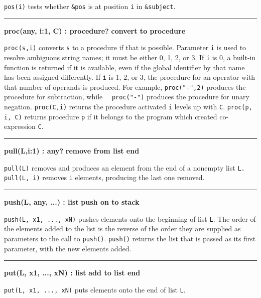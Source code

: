 \noindent
{}\texttt{pos(i)} tests whether \texttt{\&pos} is at
position \texttt{i} in \texttt{\&subject}.

\bigskip\hrule\vspace{0.1cm}
\noindent
{\bf proc(any, i:1, C) : procedure? } \hfill {\bf convert to procedure}

\noindent
{}\texttt{proc(s,i)} converts \texttt{s} to a procedure
if that is possible. Parameter \texttt{i} is used to resolve ambiguous
string names; it must be either 0, 1, 2, or 3. If \texttt{i} is 0, a
built-in function is returned if it is available, even if the global
identifier by that name has been assigned differently. If \texttt{i} is
1, 2, or 3, the procedure for an operator with that number of operands
is produced. For example,
\texttt{proc("-",2)} produces the procedure
for subtraction, while
\ \ \texttt{proc("-")} produces the
procedure for unary negation. \texttt{proc(C,i)} returns the procedure
activated \texttt{i} levels up with \texttt{C}. \texttt{proc(p, i, C)}
returns procedure \texttt{p} if it belongs to the program which created
co-expression \texttt{C}.

\bigskip\hrule\vspace{0.1cm}
\noindent
{\bf pull(L,i:1) : any? } \hfill {\bf remove from list end}\WarningNotThreadSafe

\noindent
{}\texttt{pull(L)} removes and produces an element from the
end of a nonempty list \texttt{L.} \texttt{pull(L, i)} removes
\texttt{i} elements, producing the last one removed.

\bigskip\hrule\vspace{0.1cm}
\noindent
{\bf push(L, any, ...) : list } \hfill {\bf push on to stack}\WarningNotThreadSafe

\noindent
\texttt{push(L, x1, ..., xN)} pushes elements onto the beginning of list
\texttt{L}. The order of the elements added to the list is the reverse
of the order they are supplied as parameters to the call to
\texttt{push()}. \texttt{push()} returns the list that is
passed as its first parameter, with the new elements added.

\hrule\vspace{0.1cm}
\noindent
{\bf put(L, x1, ..., xN) : list } \hfill {\bf add to list end}\WarningNotThreadSafe

\noindent
{}\texttt{put(L, x1, ..., xN)} puts elements onto the end of
list \texttt{L}.

